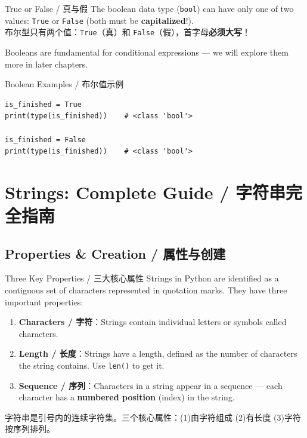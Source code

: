 \documentclass[11pt,a4paper]{article}
\begin{document}
\begin{concept}{True or False / 真与假}
    The boolean data type (\texttt{bool}) can have only one of two values: \texttt{True} or \texttt{False} (both must be \textbf{capitalized}!). \\
    布尔型只有两个值：\texttt{True}（真）和 \texttt{False}（假），首字母\textbf{必须大写}！

    Booleans are fundamental for conditional expressions — we will explore them more in later chapters.
\end{concept}

\begin{examplebox}{Boolean Examples / 布尔值示例}
\begin{lstlisting}
is_finished = True
print(type(is_finished))    # <class 'bool'>

is_finished = False
print(type(is_finished))    # <class 'bool'>
\end{lstlisting}
\end{examplebox}

\section{Strings: Complete Guide / 字符串完全指南}

\subsection{Properties \& Creation / 属性与创建}

\begin{concept}{Three Key Properties / 三大核心属性}
    Strings in Python are identified as a contiguous set of characters represented in quotation marks. They have three important properties:
    \begin{enumerate}[itemsep=0.3em]
        \item \textbf{Characters / 字符}：Strings contain individual letters or symbols called characters.
        \item \textbf{Length / 长度}：Strings have a length, defined as the number of characters the string contains. Use \texttt{len()} to get it.
        \item \textbf{Sequence / 序列}：Characters in a string appear in a sequence — each character has a \textbf{numbered position} (index) in the string.
    \end{enumerate}
    字符串是引号内的连续字符集。三个核心属性：(1)由字符组成 (2)有长度 (3)字符按序列排列。
\end{concept}
\end{document}
